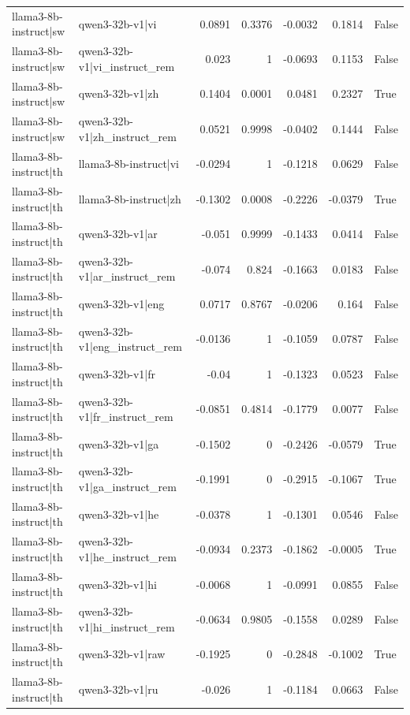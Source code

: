 \begin{table}
\begin{tabular}{l l r r r r l}
llama3-8b-instruct|sw & qwen3-32b-v1|vi & 0.0891 & 0.3376 & -0.0032 & 0.1814 & False \\
llama3-8b-instruct|sw & qwen3-32b-v1|vi_instruct_rem & 0.023 & 1 & -0.0693 & 0.1153 & False \\
llama3-8b-instruct|sw & qwen3-32b-v1|zh & 0.1404 & 0.0001 & 0.0481 & 0.2327 & True \\
llama3-8b-instruct|sw & qwen3-32b-v1|zh_instruct_rem & 0.0521 & 0.9998 & -0.0402 & 0.1444 & False \\
llama3-8b-instruct|th & llama3-8b-instruct|vi & -0.0294 & 1 & -0.1218 & 0.0629 & False \\
llama3-8b-instruct|th & llama3-8b-instruct|zh & -0.1302 & 0.0008 & -0.2226 & -0.0379 & True \\
llama3-8b-instruct|th & qwen3-32b-v1|ar & -0.051 & 0.9999 & -0.1433 & 0.0414 & False \\
llama3-8b-instruct|th & qwen3-32b-v1|ar_instruct_rem & -0.074 & 0.824 & -0.1663 & 0.0183 & False \\
llama3-8b-instruct|th & qwen3-32b-v1|eng & 0.0717 & 0.8767 & -0.0206 & 0.164 & False \\
llama3-8b-instruct|th & qwen3-32b-v1|eng_instruct_rem & -0.0136 & 1 & -0.1059 & 0.0787 & False \\
llama3-8b-instruct|th & qwen3-32b-v1|fr & -0.04 & 1 & -0.1323 & 0.0523 & False \\
llama3-8b-instruct|th & qwen3-32b-v1|fr_instruct_rem & -0.0851 & 0.4814 & -0.1779 & 0.0077 & False \\
llama3-8b-instruct|th & qwen3-32b-v1|ga & -0.1502 & 0 & -0.2426 & -0.0579 & True \\
llama3-8b-instruct|th & qwen3-32b-v1|ga_instruct_rem & -0.1991 & 0 & -0.2915 & -0.1067 & True \\
llama3-8b-instruct|th & qwen3-32b-v1|he & -0.0378 & 1 & -0.1301 & 0.0546 & False \\
llama3-8b-instruct|th & qwen3-32b-v1|he_instruct_rem & -0.0934 & 0.2373 & -0.1862 & -0.0005 & True \\
llama3-8b-instruct|th & qwen3-32b-v1|hi & -0.0068 & 1 & -0.0991 & 0.0855 & False \\
llama3-8b-instruct|th & qwen3-32b-v1|hi_instruct_rem & -0.0634 & 0.9805 & -0.1558 & 0.0289 & False \\
llama3-8b-instruct|th & qwen3-32b-v1|raw & -0.1925 & 0 & -0.2848 & -0.1002 & True \\
llama3-8b-instruct|th & qwen3-32b-v1|ru & -0.026 & 1 & -0.1184 & 0.0663 & False \\

\end{tabular}
\end{table}
